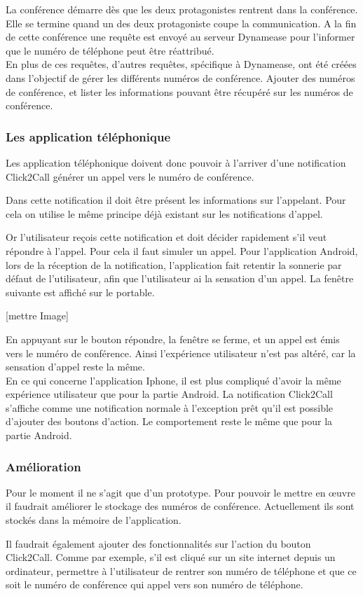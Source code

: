 La conférence démarre dès que les deux protagonistes rentrent dans la conférence. Elle se termine quand un des deux protagoniste coupe la communication. A la fin de cette conférence une requête est envoyé au serveur Dynamease pour l'informer que le numéro de téléphone peut être réattribué.\\

En plus de ces requêtes, d'autres requêtes, spécifique à Dynamease, ont été créées dans l'objectif de gérer les différents numéros de conférence. Ajouter des numéros de conférence, et lister les informations pouvant être récupéré  sur les numéros de conférence.

\subsubsection{Les application téléphonique} 

Les application téléphonique doivent donc pouvoir à l'arriver d'une notification Click2Call générer un appel vers le numéro de conférence.

Dans cette notification il doit être présent les informations sur l'appelant. Pour cela on utilise le même principe déjà existant sur les notifications d'appel.

Or l'utilisateur reçois cette notification et doit décider rapidement s'il veut répondre à l'appel. Pour cela il faut simuler un appel. Pour l'application Android, lors de la réception de la notification, l'application fait retentir la sonnerie par défaut de l'utilisateur, afin que l'utilisateur ai la sensation d'un appel. La fenêtre suivante est affiché sur le portable.

[mettre Image]

En appuyant sur le bouton répondre, la fenêtre se ferme, et un appel est émis vers le numéro de conférence. Ainsi l'expérience utilisateur n'est pas altéré, car la sensation d'appel reste la même.\\

En ce qui concerne l'application Iphone, il est plus compliqué d'avoir la même expérience utilisateur que pour la partie Android. La notification Click2Call s'affiche comme une notification normale à l'exception prêt qu'il est possible d'ajouter des boutons d'action.
Le comportement reste le même que pour la partie Android.

\subsubsection{Amélioration}

Pour le moment il ne s'agit que d'un prototype. Pour pouvoir le mettre en œuvre il faudrait améliorer le stockage des numéros de conférence. Actuellement ils sont stockés dans la mémoire de l'application.

Il faudrait également ajouter des fonctionnalités sur l'action du bouton Click2Call. Comme par exemple, s'il est cliqué sur un site internet depuis un ordinateur, permettre à l'utilisateur de rentrer son numéro de téléphone et que ce soit le numéro de conférence qui appel vers son numéro de téléphone.
